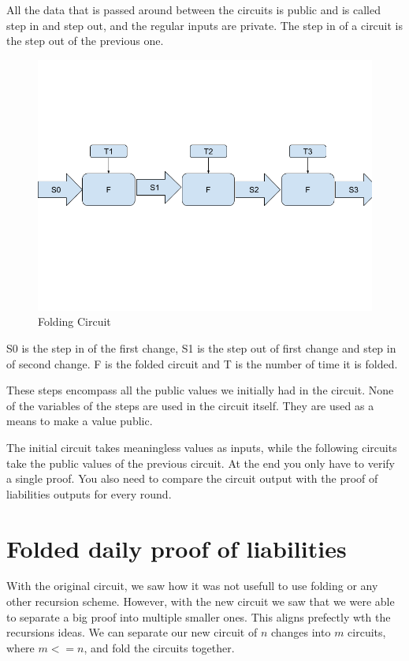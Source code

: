   All the data that is passed around between the circuits is public and is called step in and step out, and the regular inputs are private.
   The step in of a circuit is the step out of the previous one. 

\begin{figure}[H]
   \centering
   \includegraphics[width=130mm]{FoldingCircuit.png}
   \caption{Folding Circuit}
   \label{overflow}
   \end{figure}

S0 is the step in of the first change, S1 is the step out of first change and step in of second change. F is the folded circuit
and T is the number of time it is folded.

These steps encompass all the public values we initially had in the circuit.
None of the variables of the steps are used in the circuit itself. They are used as a means to make a value public.

The initial circuit takes meaningless values as inputs, while the following circuits take the public values of the previous circuit.
At the end you only have to verify a single proof. You also need to compare the circuit output with the proof of liabilities outputs for every round.

\section{Folded daily proof of liabilities}
With the original circuit, we saw how it was not usefull to use folding or any other recursion scheme.
However, with the new circuit we saw that we were able to separate a big proof into multiple smaller ones.
This aligns prefectly wth the recursions ideas.
We can separate our new circuit of $n$ changes into $m$ circuits, where $m <= n$, and fold the circuits together.

